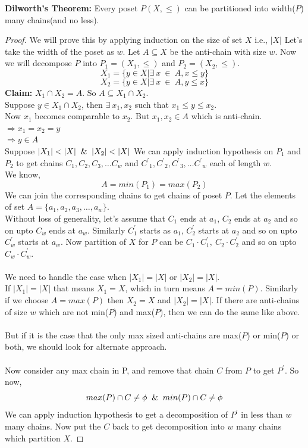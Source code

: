 \begin{theorem}
\textbf{Dilworth's Theorem:} Every poset $P(X,\leq)$ can be partitioned into width($P$) many chains(and no less).
\begin{proof}
We will prove this by applying induction on the size of set $X$ i.e., $|X|$
Let's take the width of the poset as $w$. Let $A \subseteq X$ be the anti-chain with size $w$. Now we will decompose $P$ into $P_1 = (X_1,\leq)$ and $P_2 = (X_2,\leq)$.
$$X_1 = \{y \in X | \exists~ x ~ \in ~ A, x \leq y\}$$
$$X_2 = \{y \in X | \exists~ x ~ \in ~ A, y \leq x\}$$
\textbf{Claim:} $X_1 \cap X_2 = A$. So $A \subseteq X_1 \cap X_2$.\\
Suppose $y \in X_1 \cap X_2$, then $\exists~ x_1, x_2$ such that $x_1 \leq y \leq x_2$.\\
Now $x_1$ becomes comparable to $x_2$. But $x_1, x_2 \in A$ which is anti-chain.\\
$\Rightarrow x_1 = x_2 = y$\\
$\Rightarrow y \in A$\\
Suppose $|X_1| < |X| \And |X_2| < |X|$
We can apply induction hypothesis on $P_1$ and $P_2$ to get chains $C_1, C_2, C_3, \ldots C_w$ and ${C^'}_1, {C^'}_2, {C^'}_3, \ldots {C^'}_w$ each of length $w$.\\
We know,\\
$$A = min(P_1) = max(P_2)$$
We can join the corresponding chains to get chains of poset $P$. Let the elements of set $A = \{a_1,a_2,a_3,\ldots,a_w\}$.\\
Without loss of generality, let's assume that $C_1$ ends at $a_1$, $C_2$ ends at $a_2$ and so on upto $C_w$ ends at $a_w$. Similarly $C_1^'$ starts as $a_1$, $C_2^'$ starts at $a_2$ and so on upto $C_w^'$ starts at $a_w$. Now partition of $X$ for $P$ can be $C_1 \cdot {C_1^'}, ~C_2 \cdot {C_2^'}$ and so on upto $C_w \cdot {C_w^'}$.\\\\
We need to handle the case when $|X_1| = |X|$ or $|X_2| = |X|$.\\
If $|X_1| = |X|$ that means $X_1 = X$, which in turn means $A = min(P)$. Similarly if we choose $A = max(P)$ then $X_2 = X$ and $|X_2| = |X|$. If there are anti-chains of size $w$ which are not min($P$) and max($P$), then we can do the same like above.\\\\
But if it is the case that the only max sized anti-chains are max($P$) or min($P$) or both, we should look for alternate approach.\\\\
Now consider any max chain in P, and remove that chain $C$ from $P$ to get $P^'$. So now,\\
$$max(P) \cap C \neq \phi \And min(P) \cap C \neq \phi$$
We can apply induction hypothesis to get a decomposition of $P^'$ in less than $w$ many chains. Now put the $C$ back to get decomposition into $w$ many chains which partition $X$.

\end{proof}
\end{theorem}

